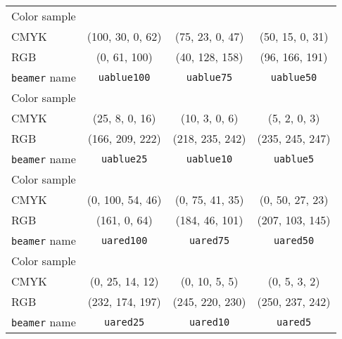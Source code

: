 \begin{table}
\setlength{\figurewidth}{12mm}
\centering
\begin{tabulary}{\textwidth}{LCCC}\toprule
Color sample &  &  & \\
CMYK & (100, 30, 0, 62) & (75, 23, 0, 47) & (50, 15, 0, 31)\\
RGB  & (0, 61, 100)     & (40, 128, 158)  & (96, 166, 191)\\
\texttt{beamer} name & \lstinline!uablue100! & \lstinline!uablue75! & \lstinline!uablue50!\\[3mm]
Color sample &  &  & \\
CMYK & (25, 8, 0, 16)  & (10, 3, 0, 6)   & (5, 2, 0, 3)\\
RGB  & (166, 209, 222) & (218, 235, 242) & (235, 245, 247)\\
\texttt{beamer} name & \lstinline!uablue25! & \lstinline!uablue10! & \lstinline!uablue5!\\\midrule

Color sample &  &  & \\
CMYK & (0, 100, 54, 46) & (0, 75, 41, 35) & (0, 50, 27, 23)\\
RGB  & (161, 0, 64)     & (184, 46, 101)  & (207, 103, 145)\\
\texttt{beamer} name & \lstinline!uared100! & \lstinline!uared75! & \lstinline!uared50!\\[3mm]
Color sample &  &  & \\
CMYK & (0, 25, 14, 12)  & (0, 10, 5, 5)   & (0, 5, 3, 2)\\
RGB  & (232, 174, 197) & (245, 220, 230) & (250, 237, 242)\\
\texttt{beamer} name & \lstinline!uared25! & \lstinline!uared10! & \lstinline!uared5!\\\midrule


\end{tabulary}
\end{table}
